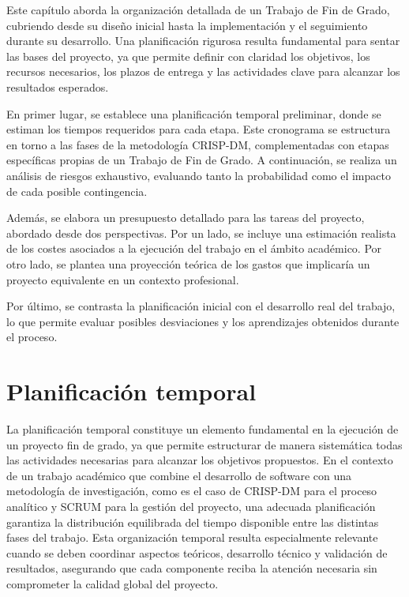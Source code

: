 Este capítulo aborda la organización detallada de un Trabajo de Fin de Grado, cubriendo desde su diseño inicial hasta la implementación y el seguimiento durante su desarrollo. Una planificación rigurosa resulta fundamental para sentar las bases del proyecto, ya que permite definir con claridad los objetivos, los recursos necesarios, los plazos de entrega y las actividades clave para alcanzar los resultados esperados.

En primer lugar, se establece una planificación temporal preliminar, donde se estiman los tiempos requeridos para cada etapa. Este cronograma se estructura en torno a las fases de la metodología CRISP-DM, complementadas con etapas específicas propias de un Trabajo de Fin de Grado. A continuación, se realiza un análisis de riesgos exhaustivo, evaluando tanto la probabilidad como el impacto de cada posible contingencia.

Además, se elabora un presupuesto detallado para las tareas del proyecto, abordado desde dos perspectivas. Por un lado, se incluye una estimación realista de los costes asociados a la ejecución del trabajo en el ámbito académico. Por otro lado, se plantea una proyección teórica de los gastos que implicaría un proyecto equivalente en un contexto profesional.

Por último, se contrasta la planificación inicial con el desarrollo real del trabajo, lo que permite evaluar posibles desviaciones y los aprendizajes obtenidos durante el proceso.

\section{Planificación temporal}

La planificación temporal constituye un elemento fundamental en la ejecución de un proyecto fin de grado, ya que permite estructurar de manera sistemática todas las actividades necesarias para alcanzar los objetivos propuestos. En el contexto de un trabajo académico que combine el desarrollo de software con una metodología de investigación, como es el caso de CRISP-DM para el proceso analítico y SCRUM para la gestión del proyecto, una adecuada planificación garantiza la distribución equilibrada del tiempo disponible entre las distintas fases del trabajo. Esta organización temporal resulta especialmente relevante cuando se deben coordinar aspectos teóricos, desarrollo técnico y validación de resultados, asegurando que cada componente reciba la atención necesaria sin comprometer la calidad global del proyecto.


